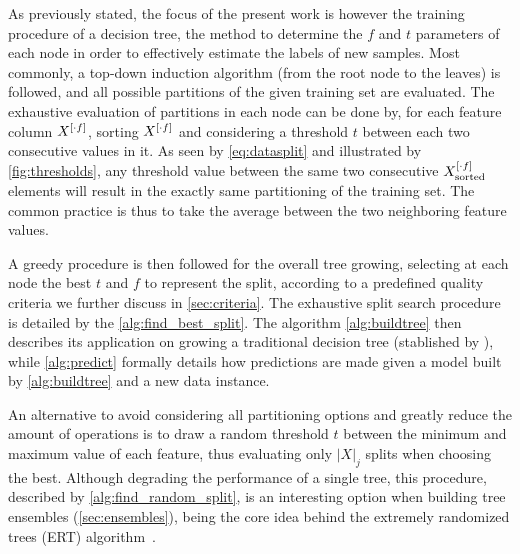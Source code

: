 As previously stated, the focus of the present work is however the training procedure of a decision tree, the method to determine the $f$ and $t$ parameters of each node in order to effectively estimate the labels of new samples. Most commonly, a top-down induction algorithm (from the root node to the leaves) is followed, and all possible partitions of the given training set are evaluated.
The exhaustive evaluation of partitions in each node can be done by, for each feature column $X^{[\cdot f]}$, sorting $X^{[\cdot f]}$ and considering a threshold $t$ between each two consecutive values in it. As seen by \autoref{eq:datasplit} and illustrated by \autoref{fig:thresholds}, any threshold value between the same two consecutive $X^{[\cdot f]}_\text{sorted}$ elements will result in the exactly same partitioning of the training set. The common practice is thus to take the average between the two neighboring feature values.

A greedy procedure is then followed for the overall tree growing, selecting at each node the best $t$ and $f$ to represent the split, according to a predefined quality criteria we further discuss in \autoref{sec:criteria}.
%
The exhaustive split search procedure is detailed by the \autoref{alg:find_best_split}. The algorithm \ref{alg:buildtree} then describes its application on growing a traditional decision tree (stablished by \citet{breiman1984classification}),
while \ref{alg:predict} formally details how predictions are made given a model built by \ref{alg:buildtree} and a new data instance.

\algPredict
\algBuildTree
\algFindBestSplit

An alternative to avoid considering all partitioning options and greatly reduce the amount of operations is to draw a random threshold $t$ between the minimum and maximum value of each feature, thus evaluating only $|X|_j$ splits when choosing the best. Although degrading the performance of a single tree, this procedure, described by \ref{alg:find_random_split}, is an interesting option when building tree ensembles (\autoref{sec:ensembles}), being the core idea behind the extremely randomized trees (ERT) algorithm~\cite{geurts2006extremely}.

\algFindRandomSplit

